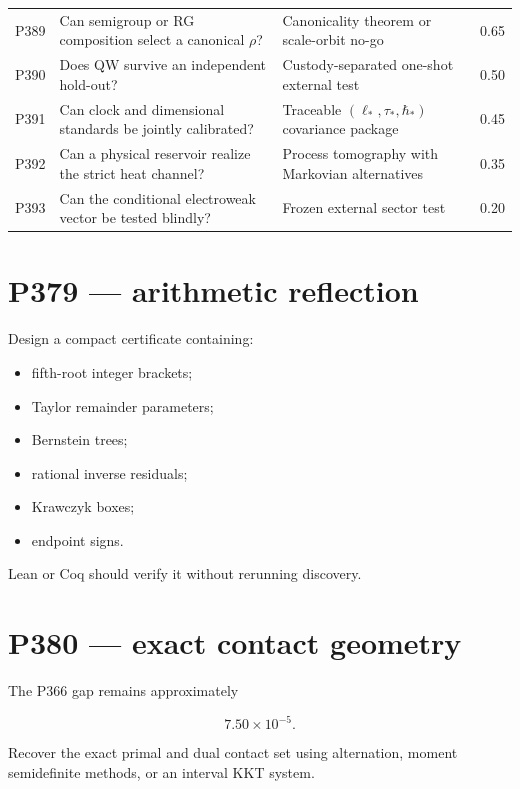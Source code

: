 \documentclass[11pt,a4paper,openany]{report}
\begin{document}
\begin{center}
\begin{longtable}{@{}p{}p{}p{}p{}@{}}
P389 & Can semigroup or RG composition select a canonical \(\rho\)? & Canonicality theorem or scale-orbit no-go & 0.65 \\
P390 & Does QW survive an independent hold-out? & Custody-separated one-shot external test & 0.50 \\
P391 & Can clock and dimensional standards be jointly calibrated? & Traceable \((\ell_*,\tau_*,\hbar_*)\) covariance package & 0.45 \\
P392 & Can a physical reservoir realize the strict heat channel? & Process tomography with Markovian alternatives & 0.35 \\
P393 & Can the conditional electroweak vector be tested blindly? & Frozen external sector test & 0.20 \\
\bottomrule
\end{longtable}
\endgroup
\end{center}

\section{P379 --- arithmetic reflection}

Design a compact certificate containing:

\begin{itemize}
\item 
fifth-root integer brackets;

\item 
Taylor remainder parameters;

\item 
Bernstein trees;

\item 
rational inverse residuals;

\item 
Krawczyk boxes;

\item 
endpoint signs.

\end{itemize}

Lean or Coq should verify it without rerunning discovery.

\section{P380 --- exact contact geometry}

The P366 gap remains approximately

\[
7.50\times10^{-5}.
\]

Recover the exact primal and dual contact set using alternation, moment semidefinite methods, or an interval KKT system.
\end{document}
